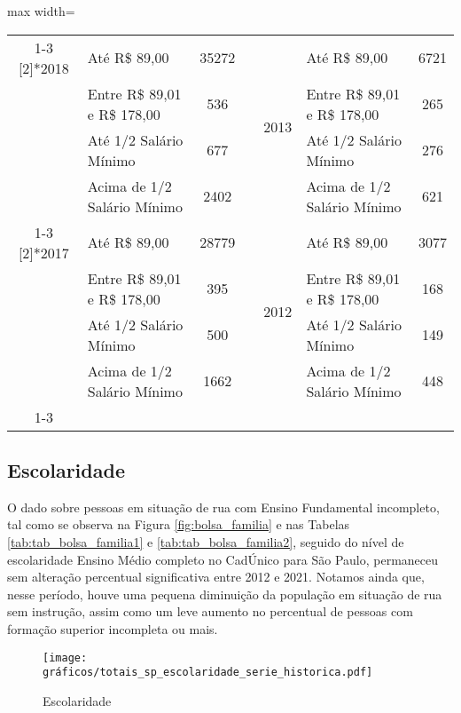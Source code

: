 \documentclass[14pt]{extarticle}
\begin{document}
\begin{table}[htbp]
\begin{adjustbox}{max width=\linewidth}
\begin{tabular}{clccclc}
\cmidrule{1-3}\cmidrule{5-7}    \multirow{4}[2]{*}{2018} & Até R\$ 89,00 & 35272 &      & \multirow{4}[2]{*}{2013} & Até R\$ 89,00 & 6721 \\
         & Entre R\$ 89,01 e R\$ 178,00 & 536  &      &      & Entre R\$ 89,01 e R\$ 178,00 & 265 \\
         & Até 1/2 Salário Mínimo & 677  &      &      & Até 1/2 Salário Mínimo & 276 \\
         & Acima de 1/2 Salário Mínimo & 2402 &      &      & Acima de 1/2 Salário Mínimo & 621 \\
\cmidrule{1-3}\cmidrule{5-7}    \multirow{4}[2]{*}{2017} & Até R\$ 89,00 & 28779 &      & \multirow{4}[2]{*}{2012} & Até R\$ 89,00 & 3077 \\
         & Entre R\$ 89,01 e R\$ 178,00 & 395  &      &      & Entre R\$ 89,01 e R\$ 178,00 & 168 \\
         & Até 1/2 Salário Mínimo & 500  &      &      & Até 1/2 Salário Mínimo & 149 \\
         & Acima de 1/2 Salário Mínimo & 1662 &      &      & Acima de 1/2 Salário Mínimo & 448 \\
\cmidrule{1-3}\cmidrule{5-7}    
\end{tabular}%
   \end{adjustbox}
  \label{tab:tabela_renda2}%
\end{table}%


\subsection{Escolaridade}
\label{escolaridade}

O dado sobre pessoas em situação de rua com Ensino Fundamental incompleto, tal como se observa na Figura \ref{fig:bolsa_familia} e nas Tabelas \ref{tab:tab_bolsa_familia1} e \ref{tab:tab_bolsa_familia2}, seguido do nível de escolaridade Ensino Médio completo no CadÚnico para São Paulo, permaneceu sem alteração percentual significativa entre 2012 e 2021. Notamos ainda que, nesse período, houve uma pequena diminuição da população em situação de rua sem instrução, assim como um leve aumento no percentual de pessoas com formação superior incompleta ou mais.\\


\begin{figure}[H]
\centering
	\caption{Escolaridade}
	\texttt{[image: gráficos/totais\_sp\_escolaridade\_serie\_historica.pdf]}
	\label{fig:escolaridade}
\end{figure}
\end{document}
